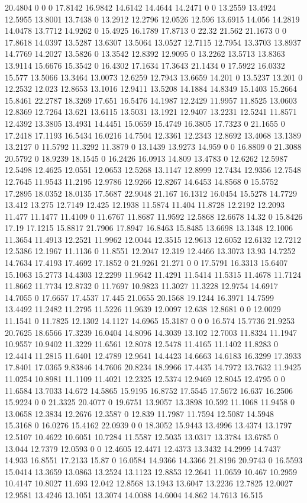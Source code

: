 20.4804 0 0 0 17.8142 16.9842 14.6142 14.4644 14.2471 0 0 13.2559 13.4924 12.5955 13.8001 13.7438 0 13.2912 12.2796 12.0526 12.596 13.6915 14.056 14.2819 14.0478 13.7712 14.9262 0 15.4925 16.1789 17.8713 0 22.32 21.562 21.1673 0 0 17.8618 14.0397 13.5287 13.6307 13.5064 13.0527 12.7115 12.7954 13.3703 13.8937 14.7769 14.2027 13.5826 0 13.3542 12.8392 12.9095 0 13.2262 13.5713 13.8363 13.9114 15.6676 15.3542 0 16.4302 17.1634 17.3643 21.1434 0 17.5922 16.0332 15.577 13.5066 13.3464 13.0073 12.6259 12.7943 13.6659 14.201 0 13.5237 13.201 0 12.2532 12.023 12.8653 13.1016 12.9411 13.5208 14.1884 14.8349 15.1403 15.2664 15.8461 22.2787 18.3269 17.651 16.5476 14.1987 12.2429 11.9957 11.8525 13.0603 12.8369 12.7264 13.621 13.6115 13.5031 13.1921 12.9407 13.2231 12.5241 11.8571 12.4392 13.3805 13.4931 14.4451 15.0659 15.4749 16.3805 17.7323 0 21.1655 0 17.2418 17.1193 16.5434 16.0216 14.7504 12.3361 12.2343 12.8692 13.4068 13.1389 13.2127 0 11.5792 11.3292 11.3879 0 13.1439 13.9273 14.959 0 0 16.8809 0 21.3088 20.5792 0 18.9239 18.1545 0 16.2426 16.0913 14.809 13.4783 0 12.6262 12.5987 12.5498 12.4625 12.0551 12.0653 12.5268 13.1147 12.8999 12.7434 12.9356 12.7548 12.7645 11.9543 11.2195 12.9786 12.9266 12.8267 14.6453 14.8568 0 15.5752 17.2895 18.0352 18.0135 17.5687 22.9048 21.167 16.1312 16.0454 15.5278 14.7729 13.412 13.275 12.7149 12.425 12.1938 11.5874 11.404 11.8728 12.2192 12.2093 11.477 11.1477 11.4109 0 11.6767 11.8687 11.9592 12.5868 12.6678 14.32 0 15.8426 17.19 17.1215 15.8817 21.7906 17.8947 16.8463 15.8485 13.6698 13.1348 12.1006 11.3654 11.4913 12.2521 11.9962 12.0044 12.3515 12.9613 12.6052 12.6132 12.7212 12.5386 12.1967 11.1136 0 11.8551 12.2047 12.319 12.4466 13.3073 13.93 14.7252 14.7634 17.4193 17.4692 17.1852 0 21.9261 21.271 0 0 17.5791 16.3313 15.6407 15.1063 15.2773 14.4303 12.2299 11.9642 11.4291 11.5414 11.5315 11.4678 11.7124 11.8662 11.7734 12.8732 0 11.7697 10.9823 11.3027 11.3228 12.9754 14.6917 14.7055 0 17.6657 17.4537 17.445 21.0655 20.1568 19.1244 16.3971 14.7599 13.4492 11.2482 11.2795 11.5226 11.9639 12.0097 12.638 12.8681 0 0 12.0029 11.1541 0 11.7825 12.1302 14.1127 14.6965 15.3187 0 0 0 16.574 15.7736 21.9253 20.7625 18.6566 17.3239 16.0404 14.8096 14.3039 13.102 12.7003 11.8324 11.1947 10.9557 10.9402 11.3229 11.6561 12.8078 12.5478 11.4165 11.1402 11.8283 0 12.4414 11.2815 11.6401 12.4789 12.9641 14.4423 14.6663 14.6183 16.3299 17.3933 17.8401 17.0365 9.83846 14.7606 20.8234 18.9966 17.4435 14.7972 13.7632 11.9425 11.0254 10.8981 11.1109 11.4021 12.2325 12.5374 12.9469 12.8045 12.4795 0 0 11.6584 13.7033 14.672 14.5865 15.9195 16.8752 17.5545 17.5672 16.637 16.2506 15.9224 0 0 21.3325 20.4077 0 19.6751 13.9057 13.3898 10.592 11.1068 11.9458 0 13.0658 12.3834 12.2676 12.3587 0 12.839 11.7987 11.7594 12.5087 14.5948 15.3168 0 16.0276 15.4162 22.0939 0 0 18.3052 15.9443 13.4996 13.4374 13.1797 12.5107 10.4622 10.6051 10.7284 11.5587 12.5035 13.0317 13.3784 13.6785 0 13.044 12.7379 12.0593 0 0 12.4605 12.4471 12.4373 13.3432 14.2999 14.7437 14.933 16.8551 17.2133 15.87 0 16.0584 14.9366 14.3366 21.8196 20.9743 0 16.5593 15.0414 13.3659 13.0863 13.2524 13.1123 12.8853 12.2641 11.0659 10.467 10.2959 10.4147 10.8027 11.693 12.042 12.8568 13.1943 13.6047 13.2236 12.7825 12.0027 12.9581 13.4246 13.1051 13.3074 14.0088 14.6004 14.862 14.7613 16.515 
